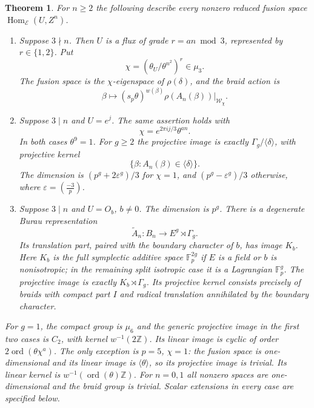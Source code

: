 \documentclass[11pt]{amsart}
\newtheorem{theorem}{Theorem}[section]
\newcommand{\Fp}{\mathbb F_p}
\newcommand{\Hom}{\operatorname{Hom}}
\begin{document}
\begin{theorem}\label{main}
For $n\ge2$ the following describe every nonzero reduced fusion space
$\Hom_{\mathcal E}(U,Z^n)$.
\begin{enumerate}
\item Suppose $3\nmid n$. Then $U$ is a flux of grade
$r=an\bmod3$, represented by $r\in\{1,2\}$. Put
\[
\chi=(\theta_U/\theta^{n^2})^r\in\mu_3.
\]
The fusion space is the $\chi$-eigenspace of $\rho(\delta)$, and the
braid action is
\begin{equation}\label{closedaction}
\beta\longmapsto (s_p\theta)^{w(\beta)}
\rho(A_n(\beta))\big|_{\mathscr W_\chi}.
\end{equation}
\item Suppose $3\mid n$ and $U=e^j$. The same assertion holds with
\[
\chi=e^{2\pi i j/3}\theta^{an}.
\]
In both cases $\theta^9=1$. For $g\ge2$ the projective image is exactly
$\Gamma_g/\langle\delta\rangle$, with projective kernel
\[
\{\beta:A_n(\beta)\in\langle\delta\rangle\}.
\]
The dimension is $(p^g+2\varepsilon^g)/3$ for $\chi=1$, and
$(p^g-\varepsilon^g)/3$ otherwise, where $\varepsilon=(\frac{-3}p)$.
\item Suppose $3\mid n$ and $U=O_b$, $b\ne0$. The dimension is $p^g$.
There is a degenerate Burau representation
\[
\widetilde A_n:B_n\longrightarrow E^g\rtimes\Gamma_g.
\]
Its translation part, paired with the boundary character of $b$, has
image $K_b$. Here $K_b$ is the full symplectic additive space $\Fp^{2g}$
if $E$ is a field or $b$ is nonisotropic; in the remaining split
isotropic case it is a Lagrangian $\Fp^g$.
The projective image is exactly $K_b\rtimes\Gamma_g$.
Its projective kernel consists precisely of braids with compact part
$I$ and radical translation annihilated by the boundary character.
\end{enumerate}
For $g=1$, the compact group is $\mu_6$ and the generic projective
image in the first two cases is $C_2$, with kernel $w^{-1}(2\mathbb Z)$.
Its linear image is cyclic of order
$2\operatorname{ord}(\theta\chi^a)$. The only exception is
$p=5$, $\chi=1$: the fusion space is one-dimensional and its linear
image is $\langle\theta\rangle$, so its projective image is trivial.
Its linear kernel is $w^{-1}(\operatorname{ord}(\theta)\mathbb Z)$.
For $n=0,1$ all nonzero spaces are one-dimensional and the braid group
is trivial. Scalar extensions in every case are specified below.
\end{theorem}
\end{document}
